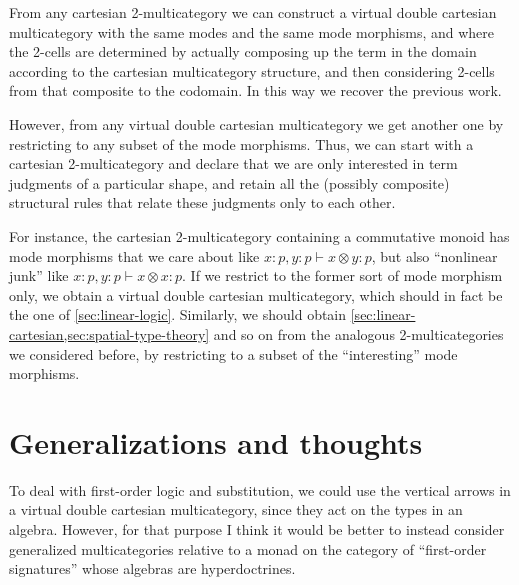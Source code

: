 \documentclass{article}
\let\types\vdash
\begin{document}
From any cartesian 2-multicategory we can construct a virtual double cartesian multicategory with the same modes and the same mode morphisms, and where the 2-cells are determined by actually composing up the term in the domain according to the cartesian multicategory structure, and then considering 2-cells from that composite to the codomain.
In this way we recover the previous work.

However, from any virtual double cartesian multicategory we get another one by restricting to any subset of the mode morphisms.
Thus, we can start with a cartesian 2-multicategory and declare that we are only interested in term judgments of a particular shape, and retain all the (possibly composite) structural rules that relate these judgments only to each other.

For instance, the cartesian 2-multicategory containing a commutative monoid has mode morphisms that we care about like $x:p,y:p \types x\otimes y:p$, but also ``nonlinear junk'' like $x:p,y:p \types x\otimes x:p$.
If we restrict to the former sort of mode morphism only, we obtain a virtual double cartesian multicategory, which should in fact be the one of \cref{sec:linear-logic}.
Similarly, we should obtain \cref{sec:linear-cartesian,sec:spatial-type-theory} and so on from the analogous 2-multicategories we considered before, by restricting to a subset of the ``interesting'' mode morphisms.

\section{Generalizations and thoughts}
\label{sec:generalizations}

To deal with first-order logic and substitution, we could use the vertical arrows in a virtual double cartesian multicategory, since they act on the types in an algebra.
However, for that purpose I think it would be better to instead consider generalized multicategories relative to a monad on the category of ``first-order signatures'' whose algebras are hyperdoctrines.
\end{document}
